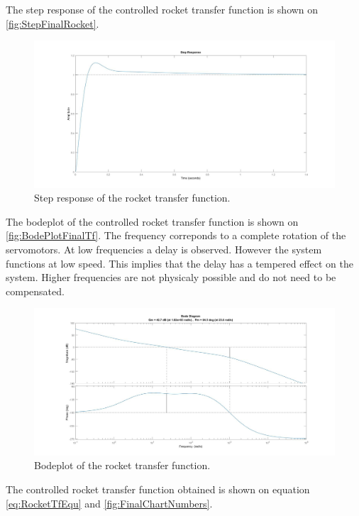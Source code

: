 The step response of the controlled rocket transfer function is shown on \autoref{fig:StepFinalRocket}.
\begin{figure}[htbp]
	\centering
	\includegraphics[width=\textwidth]{figures/Rocket/design/stepresponse_400}
	\caption{Step response of the rocket transfer function.}
	\label{fig:StepFinalRocket}
\end{figure}

The bodeplot of the controlled rocket transfer function is shown on \autoref{fig:BodePlotFinalTf}. The frequency correponds to a complete rotation of the servomotors. At low frequencies a delay is observed. However the system functions at low speed. This implies that the delay has a tempered effect on the system. Higher frequencies are not physicaly possible and do not need to be compensated.

\begin{figure}[htbp]
	\centering
		\includegraphics[width=\textwidth]{figures/Rocket/design/bodeplot}
		\caption{Bodeplot of the rocket transfer function.}
		\label{fig:BodeplotFinalTf}
\end{figure}

The controlled rocket transfer function obtained is shown on equation \autoref{eq:RocketTfEqu} and  \autoref{fig:FinalChartNumbers}.

